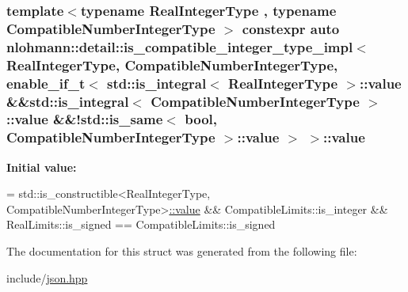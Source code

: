 \subsubsection[{\texorpdfstring{value}{value}}]{\setlength{\rightskip}{0pt plus 5cm}template$<$typename Real\+Integer\+Type , typename Compatible\+Number\+Integer\+Type $>$ constexpr auto {\bf nlohmann\+::detail\+::is\+\_\+compatible\+\_\+integer\+\_\+type\+\_\+impl}$<$ Real\+Integer\+Type, Compatible\+Number\+Integer\+Type, {\bf enable\+\_\+if\+\_\+t}$<$ std\+::is\+\_\+integral$<$ Real\+Integer\+Type $>$\+::value \&\&std\+::is\+\_\+integral$<$ Compatible\+Number\+Integer\+Type $>$\+::value \&\&!std\+::is\+\_\+same$<$ bool, Compatible\+Number\+Integer\+Type $>$\+::value $>$ $>$\+::value\hspace{0.3cm}{\ttfamily [static]}}\hypertarget{structnlohmann_1_1detail_1_1is__compatible__integer__type__impl_3_01RealIntegerType_00_01Compatie5920c849e839ebb9f8c57349c900796_a8fd20d5e7d65d14b4e9f4ee181a3aded}{}\label{structnlohmann_1_1detail_1_1is__compatible__integer__type__impl_3_01RealIntegerType_00_01Compatie5920c849e839ebb9f8c57349c900796_a8fd20d5e7d65d14b4e9f4ee181a3aded}
{\bfseries Initial value\+:}
\begin{DoxyCode}
=
        std::is\_constructible<RealIntegerType,
        CompatibleNumberIntegerType>\hyperlink{structnlohmann_1_1detail_1_1is__compatible__integer__type__impl_3_01RealIntegerType_00_01Compatie5920c849e839ebb9f8c57349c900796_a8fd20d5e7d65d14b4e9f4ee181a3aded}{::value} &&
        CompatibleLimits::is\_integer &&
        RealLimits::is\_signed == CompatibleLimits::is\_signed
\end{DoxyCode}


The documentation for this struct was generated from the following file\+:\begin{DoxyCompactItemize}
\item 
include/\hyperlink{json_8hpp}{json.\+hpp}\end{DoxyCompactItemize}
